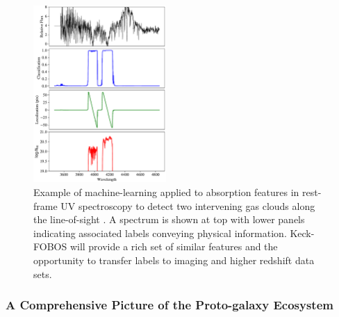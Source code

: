 \documentclass[oneside,11pt]{amsart}
\begin{document}
\begin{figure}\small
%
\includegraphics[width=0.45\textwidth]{figs/Parks18_Fig7_fig_labels.pdf}
%
\caption{Example of machine-learning applied to absorption
features in rest-frame UV spectroscopy to detect two intervening gas
clouds along the line-of-sight \citep[from][]{parks18}.  A spectrum is
shown at top with lower panels indicating associated labels conveying
physical information.  Keck-FOBOS will provide a rich set of similar
features and the opportunity to transfer labels to imaging and higher
redshift data sets.}
%
\label{fig:absorber}
%
\end{figure}

\subsubsection{A Comprehensive Picture of the Proto-galaxy Ecosystem}
\label{sec:galaxies}
~\medskip

%
%
%
%
\end{document}
